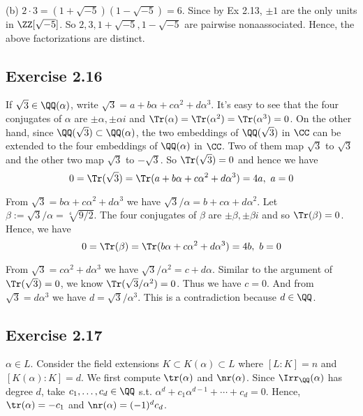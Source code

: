 \documentclass[../Chapter.tex]{subfiles}
\begin{document}
(b) $2\cdot3=(1+\sqrt{-5})(1-\sqrt{-5})=6$. Since by Ex 2.13, $\pm1$ are the only units in $\ZZ[\sqrt{-5}]$. So $2,3,1+\sqrt{-5},1-\sqrt{-5}$ are pairwise nonaassociated. Hence, the above factorizations are distinct.

\subsection*{Exercise 2.16}

If $\sqrt{3}\in\QQ(\alpha)$, write $\sqrt{3}=a+b\alpha+c\alpha^2+d\alpha^3$. It's easy to see that the four conjugates of $\alpha$ are $\pm\alpha,\pm\alpha i$ and $\Tr(\alpha)=\Tr(\alpha^2)=\Tr(\alpha^3)=0$. On the other hand, since $\QQ(\sqrt{3})\subset\QQ(\alpha)$, the two embeddings of $\QQ(\sqrt{3})$ in $\CC$ can be extended to the four embeddings of $\QQ(\alpha)$ in $\CC$. Two of them map $\sqrt{3}$ to $\sqrt{3}$ and the other two map $\sqrt{3}$ to $-\sqrt{3}$. So $\Tr(\sqrt{3})=0$ and hence we have $$0=\Tr(\sqrt{3})=\Tr(a+b\alpha+c\alpha^2+d\alpha^3)=4a, \ a=0$$

From $\sqrt{3}=b\alpha+c\alpha^2+d\alpha^3$ we have $\sqrt{3}/\alpha=b+c\alpha+d\alpha^2$. Let $\beta:=\sqrt{3}/\alpha=\sqrt[4]{9/2}$. The four conjugates of $\beta$ are $\pm\beta,\pm\beta i$ and so $\Tr(\beta)=0$. Hence, we have $$0=\Tr(\beta)=\Tr(b\alpha+c\alpha^2+d\alpha^3)=4b, \ b=0$$

From  $\sqrt{3}=c\alpha^2+d\alpha^3$ we have $\sqrt{3}/\alpha^2=c+d\alpha$. Similar to the argument of $\Tr(\sqrt{3})=0$, we know $\Tr(\sqrt{3}/\alpha^2)=0$. Thus we have $c=0$. And from $\sqrt{3}=d\alpha^3$ we have $d=\sqrt{3}/\alpha^3$. This is a contradiction because $d\in\QQ$.

\subsection*{Exercise 2.17}

$\alpha\in L$. Consider the field extensions $K\subset K(\alpha)\subset L$ where $[L:K]=n$ and $[K(\alpha):K]=d$. We first compute $\tr(\alpha)$ and $\nr(\alpha)$. Since $\Irr_\QQ(\alpha)$ has degree $d$, take $c_1,\ldots,c_d\in\QQ$ s.t. $\alpha^d+c_1\alpha^{d-1}+\cdots+c_d=0$. Hence, $\tr(\alpha)=-c_1$ and $\nr(\alpha)=(-1)^{d}c_d$.
\end{document}
